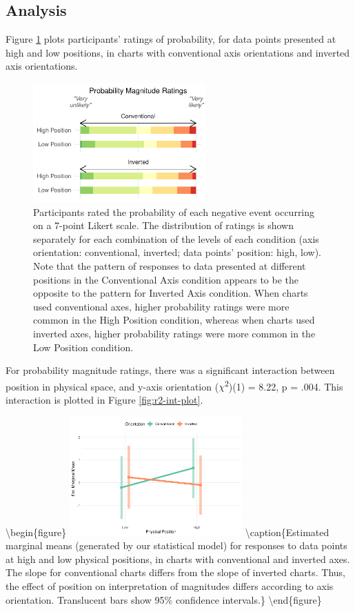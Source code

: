 \documentclass[journal]{vgtc}                %
\begin{document}
\hypertarget{analysis-1}{%
\subsection{Analysis}\label{analysis-1}}

Figure \ref{fig:r2-c-plot} plots participants' ratings of probability, for data points presented at high and low positions, in charts with conventional axis orientations and inverted axis orientations.

\begin{figure}
\includegraphics[width=250px]{position_magnitude_files/figure-latex/r2-c-plot-1} \caption{Participants rated the probability of each negative event occurring on a 7-point Likert scale. The distribution of ratings is shown separately for each combination of the levels of each condition (axis orientation: conventional, inverted; data points' position: high, low). Note that the pattern of responses to data presented at different positions in the Conventional Axis condition appears to be the opposite to the pattern for Inverted Axis condition. When charts used conventional axes, higher probability ratings were more common in the High Position condition, whereas when charts used inverted axes, higher probability ratings were more common in the Low Position condition.}\label{fig:r2-c-plot}
\end{figure}

For probability magnitude ratings, there was a significant interaction between position in physical space, and y-axis orientation (\(\chi\)\textsuperscript{2})(1) = 8.22, p = .004. This interaction is plotted in Figure \ref{fig:r2-int-plot}.

\textbackslash begin\{figure\}
\includegraphics[width=250px]{position_magnitude_files/figure-latex/r2-int-plot-1} \textbackslash caption\{Estimated marginal means (generated by our statistical model) for responses to data points at high and low physical positions, in charts with conventional and inverted axes. The slope for conventional charts differs from the slope of inverted charts. Thus, the effect of position on interpretation of magnitudes differs according to axis orientation. Translucent bars show 95\% confidence intervals.\}\label{fig:r2-int-plot}
\textbackslash end\{figure\}
\end{document}
